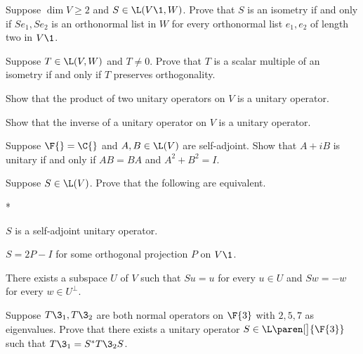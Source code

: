 
\exercise
Suppose $\dim V \ge 2$ and $S\in \L(V\1, W)$. Prove that $S$ is an isometry if and only if $Se_1, Se_2$ is an orthonormal list in $W$ for every orthonormal list $e_1, e_2$ of length two in $V\1$.\label{2iso}


\exercise
Suppose $T \in \L(V, W)$ and $T \ne 0$. Prove that $T$ is a scalar multiple of an isometry if and only if $T$ preserves orthogonality.

\exercise
\begin{SUBtheorem}
\item
Show that the product of two unitary operators on $V$ is a unitary operator.
\item
Show that the inverse of a unitary operator on $V$ is a unitary operator.
\end{SUBtheorem}


\exercise
Suppose $\F{} = \C{}$ and $A, B \in \L(V)$ are self-adjoint. Show that $A + iB$ is unitary if and only if $AB = BA$ and
$A^2 + B^2 = I$.


\exercise
Suppose $S \in \L(V)$. Prove that the following are equivalent.
\begin{subtheorem}*
\item
$S$ is a self-adjoint unitary operator.
\item
$S = 2P - I$ for some orthogonal projection $P$ on $V\1$.
\item
There exists a subspace $U$ of $V$ such that $Su = u$ for every $u \in U$ and $Sw = -w$ for every $w \in U^\perp\!$.
\end{subtheorem}
\exercisesubtheoremend


\exercise
Suppose $T\3_1, T\3_2$ are both normal operators on $\F{3}$ with $2, 5, 7$ as eigenvalues. Prove that there exists a unitary operator $S\in \L\paren[\big]{\F{3}}$ such that
$
T\3_1 = S^* T\3_2 S$.


